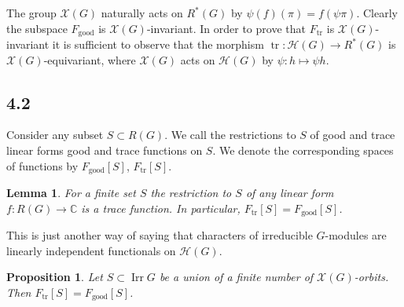 \documentclass[12pt,a4paper]{article}
\theoremstyle{plain}
\newtheorem{lemma}{Lemma}
\newtheorem{proposition}{Proposition}
\theoremstyle{definition}
\theoremstyle{remark}
\DeclareMathOperator{\Irr}{Irr}
\DeclareMathOperator{\tr}{tr}
\newcommand{\cH}{\mathscr{H}}
\newcommand{\cX}{\mathcal{X}}
\newcommand{\bC}{\mathbb{C}}
\begin{document}
The group $\cX(G)$ naturally acts on $R^*(G)$ by $\psi(f)(\pi) = f(\psi\pi)$. Clearly the subspace $F_{\text{good}}$ is $\cX(G)$-invariant. In order to prove that $F_{\tr}$ is $\cX(G)$-invariant it is sufficient to observe that the morphism $\tr: \cH(G) \to R^*(G)$ is $\cX(G)$-equivariant, where $\cX(G)$ acts on $\cH(G)$ by $\psi: h \mapsto \psi h$.

\subsection*{4.2}

Consider any subset $S \subset R(G)$. We call the restrictions to $S$ of good and trace linear forms good and trace functions on $S$. We denote the corresponding spaces of functions by $F_{\text{good}}[S]$, $F_{\tr}[S]$.

\begin{lemma}
For a finite set $S$ the restriction to $S$ of any linear form $f: R(G) \to \bC$ is a trace function. In particular, $F_{\tr}[S] = F_{\text{good}}[S]$.
\end{lemma}

This is just another way of saying that characters of irreducible $G$-modules are linearly independent functionals on $\cH(G)$.

\begin{proposition}
Let $S \subset \Irr G$ be a union of a finite number of $\cX(G)$-orbits. Then $F_{\tr}[S] = F_{\text{good}}[S]$.
\end{proposition}
\end{document}
